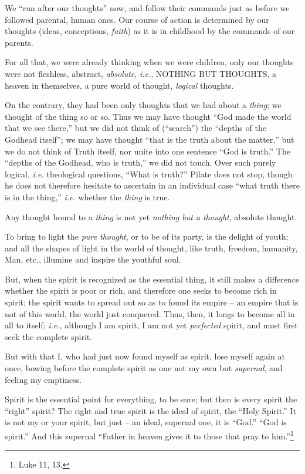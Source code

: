 \documentclass[12pt,a4paper]{book}
\begin{document}
We ``run after our thoughts'' now, and follow their commands just as before 
we followed parental, human ones. Our course of action is determined by our 
thoughts (ideas, conceptions, \textit{faith}) as it is in childhood by the 
commands of our parents.

For all that, we were already thinking when we were children, only our 
thoughts were not fleshless, abstract, \textit{absolute}, \textit{i.e.}, 
NOTHING BUT THOUGHTS, a heaven in themselves, a pure world of thought, 
\textit{logical} thoughts.

On the contrary, they had been only thoughts that we had about a 
\textit{thing}; we thought of the thing so or so. Thus we may have thought 
``God made the world that we see there,'' but we did not think of 
(``search'') the ``depths of the Godhead itself''; we may have thought 
``that is the truth about the matter,'' but we do not think of Truth itself, 
nor unite into one sentence ``God is truth.'' The ``depths of the Godhead, 
who is truth,'' we did not touch. Over such purely logical, \textit{i.e.} 
theological questions, ``What is truth?'' Pilate does not stop, though he 
does not therefore hesitate to ascertain in an individual case ``what truth 
there is in the thing,'' \textit{i.e.} whether the \textit{thing} is true.

Any thought bound to a \textit{thing} is not yet \textit{nothing but a 
thought}, absolute thought.

To bring to light the \textit{pure thought}, or to be of its party, is the 
delight of youth; and all the shapes of light in the world of thought, like 
truth, freedom, humanity, Man, etc., illumine and inspire the youthful soul.

But, when the spirit is recognized as the essential thing, it still makes a 
difference whether the spirit is poor or rich, and therefore one seeks to 
become rich in spirit; the spirit wants to spread out so as to found its 
empire -- an empire that is not of this world, the world just conquered. Thus, 
then, it longs to become all in all to itself; \textit{i.e.}, although I am 
spirit, I am not yet \textit{perfected} spirit, and must first seek the 
complete spirit.

But with that I, who had just now found myself as spirit, lose myself again at 
once, bowing before the complete spirit as one not my own but 
\textit{supernal}, and feeling my emptiness.

Spirit is the essential point for everything, to be sure; but then is every 
spirit the ``right'' spirit? The right and true spirit is the ideal of 
spirit, the ``Holy Spirit.'' It is not my or your spirit, but just -- an 
ideal, supernal one, it is ``God.'' ``God is spirit.'' And this supernal 
``Father in heaven gives it to those that pray to him.''\footnote{Luke 11, 
13.}
\end{document}
